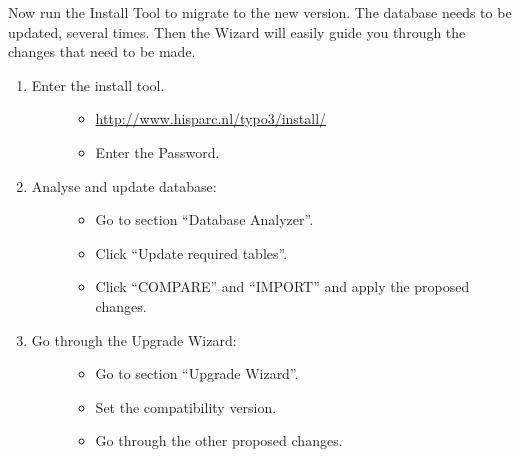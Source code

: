 \documentclass[a4paper,11pt,english]{sphinxmanual}
\begin{document}
Now run the Install Tool to migrate to the new version. The database
needs to be updated, several times. Then the Wizard will easily guide
you through the changes that need to be made.
\begin{enumerate}
\item {} \begin{description}
\item[{Enter the install tool.}] \leavevmode\begin{itemize}
\item {} 
\href{http://www.hisparc.nl/typo3/install/}{http://www.hisparc.nl/typo3/install/}

\item {} 
Enter the Password.

\end{itemize}

\end{description}

\item {} \begin{description}
\item[{Analyse and update database:}] \leavevmode\begin{itemize}
\item {} 
Go to section ``Database Analyzer''.

\item {} 
Click ``Update required tables''.

\item {} 
Click ``COMPARE'' and ``IMPORT'' and apply the proposed changes.

\end{itemize}

\end{description}

\item {} \begin{description}
\item[{Go through the Upgrade Wizard:}] \leavevmode\begin{itemize}
\item {} 
Go to section ``Upgrade Wizard''.

\item {} 
Set the compatibility version.

\item {} 
Go through the other proposed changes.

\end{itemize}

\end{description}


\end{enumerate}
\end{document}
